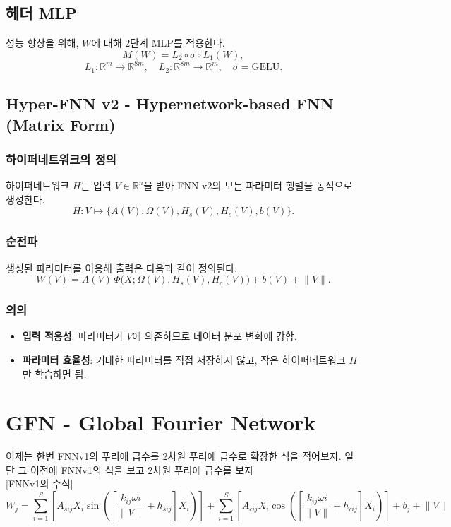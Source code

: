 \documentclass{book}
\begin{document}
\section{헤더 MLP}
성능 향상을 위해, $W$에 대해 2단계 MLP를 적용한다.
\[
M(W) = L_2 \circ \sigma \circ L_1(W),
\]
\[
L_1:\mathbb{R}^m \to \mathbb{R}^{8m}, \quad
L_2:\mathbb{R}^{8m} \to \mathbb{R}^m, \quad
\sigma=\text{GELU}.
\]

\section{Hyper-FNN v2 - Hypernetwork-based FNN (Matrix Form)}

\subsection{하이퍼네트워크의 정의}
하이퍼네트워크 $H$는 입력 $V \in \mathbb{R}^n$을 받아
FNN v2의 모든 파라미터 행렬을 동적으로 생성한다.
\[
H: V \mapsto \{A(V), \Omega(V), H_s(V), H_c(V), b(V)\}.
\]

\subsection{순전파}
생성된 파라미터를 이용해 출력은 다음과 같이 정의된다.
\[
W(V) = A(V) \, \Phi\!\big(X; \Omega(V), H_s(V), H_c(V)\big) + b(V) + \lVert V \rVert.
\]

\subsection{의의}
\begin{itemize}
\item \textbf{입력 적응성}: 파라미터가 $V$에 의존하므로 데이터 분포 변화에 강함.
\item \textbf{파라미터 효율성}: 거대한 파라미터를 직접 저장하지 않고, 작은 하이퍼네트워크 $H$만 학습하면 됨.
\end{itemize}


\chapter{GFN - Global Fourier Network}

이제는 한번 FNNv1의 푸리에 급수를 2차원 푸리에 급수로 확장한 식을 적어보자. 일단 그 이전에 FNNv1의 식을 보고 2차원 푸리에 급수를 보자\\

[FNNv1의 수식]
\[
W_j = \sum_{i=1}^{S}  \left [ A_{sij} X_i \sin \left ( \left [ \frac{k_{ij} \omega i}{\lVert V \rVert} + h_{sij} \right ] X_i \right ) \right ] +\sum_{i=1}^{S} \left [ A_{cij} X_i \cos \left ( \left [ \frac{k_{ij} \omega i}{\lVert V \rVert} + h_{cij} \right ] X_i \right ) \right ] + b_j + \lVert V \rVert
\]\\
\end{document}
